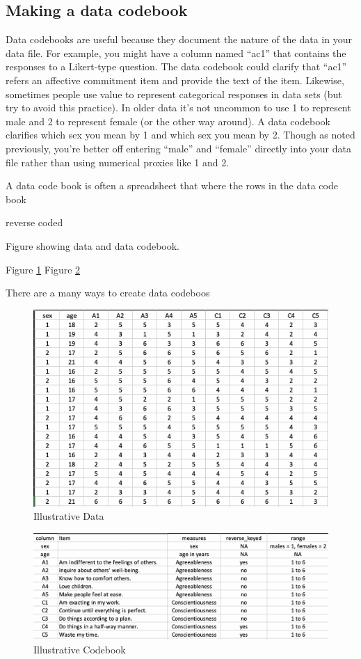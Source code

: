 \documentclass[
]{krantz}
\begin{document}
\hypertarget{making-a-data-codebook}{%
\subsection{Making a data codebook}\label{making-a-data-codebook}}

Data codebooks are useful because they document the nature of the data in your data file. For example, you might have a column named ``ac1'' that contains the responses to a Likert-type question. The data codebook could clarify that ``ac1'' refers an affective commitment item and provide the text of the item. Likewise, sometimes people use value to represent categorical responses in data sets (but try to avoid this practice). In older data it's not uncommon to use 1 to represent male and 2 to represent female (or the other way around). A data codebook clarifies which sex you mean by 1 and which sex you mean by 2. Though as noted previously, you're better off entering ``male'' and ``female'' directly into your data file rather than using numerical proxies like 1 and 2.

A data code book is often a spreadsheet that where the rows in the data code book

reverse coded

Figure showing data and data codebook.

Figure \ref{fig:bfidata}
Figure \ref{fig:bficodebook}

There are a many ways to create data codeboos

\begin{figure}
\includegraphics[width=0.85\linewidth]{ch_load_data/images/screenshot_bfi_data} \caption{Illustrative Data}\label{fig:bfidata}
\end{figure}

\begin{figure}
\includegraphics[width=0.85\linewidth]{ch_load_data/images/screenshot_bfi_codebook} \caption{Illustrative Codebook}\label{fig:bficodebook}
\end{figure}
\end{document}
